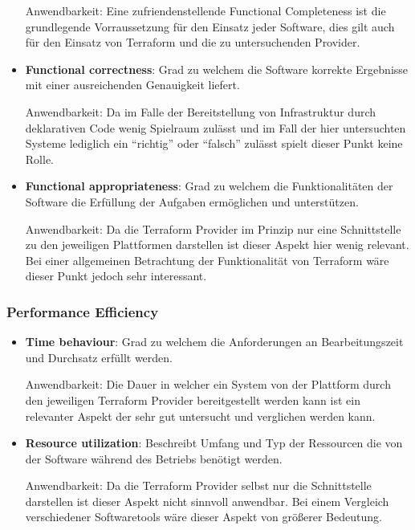 \begin{spacing}{1.2}
\begin{itemize}
  Anwendbarkeit: Eine zufriendenstellende Functional Completeness ist die
  grundlegende Vorraussetzung für den Einsatz jeder Software, dies gilt
  auch für den Einsatz von Terraform und die zu untersuchenden Provider.

  \item \textbf{Functional correctness}: Grad zu welchem die Software
  korrekte Ergebnisse mit einer ausreichenden Genauigkeit liefert.

  Anwendbarkeit: Da im Falle der Bereitstellung von Infrastruktur durch
  deklarativen Code wenig Spielraum zulässt und im Fall der hier
  untersuchten Systeme lediglich ein \enquote{richtig} oder
  \enquote{falsch} zulässt spielt dieser Punkt keine Rolle.

  \item \textbf{Functional appropriateness}: Grad zu welchem die
  Funktionalitäten der Software die Erfüllung der Aufgaben ermöglichen
  und unterstützen.

  Anwendbarkeit: Da die Terraform Provider im Prinzip nur eine
  Schnittstelle zu den jeweiligen Plattformen darstellen ist dieser Aspekt
  hier wenig relevant. Bei einer allgemeinen Betrachtung der
  Funktionalität von Terraform wäre dieser Punkt jedoch sehr interessant.
\end{itemize}

\subsubsection{Performance Efficiency}

\begin{itemize}
  \item \textbf{Time behaviour}: Grad zu welchem die Anforderungen an
  Bearbeitungszeit und Durchsatz erfüllt werden.

  Anwendbarkeit: Die Dauer in welcher ein System von der Plattform durch
  den jeweiligen Terraform Provider bereitgestellt werden kann ist ein
  relevanter Aspekt der sehr gut untersucht und verglichen werden kann.

  \item \textbf{Resource utilization}: Beschreibt Umfang und Typ der
  Ressourcen die von der Software während des Betriebs benötigt werden.

  Anwendbarkeit: Da die Terraform Provider selbst nur die
  Schnittstelle darstellen ist dieser Aspekt nicht sinnvoll anwendbar.
  Bei einem
  Vergleich verschiedener Softwaretools wäre dieser Aspekt von größerer
  Bedeutung.


\end{itemize}
\end{spacing}
